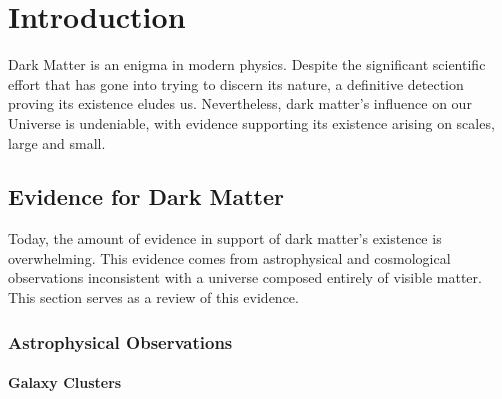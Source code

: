 \graphicspath{{img/chapter_1/}}


\chapter{Introduction}
\label{chapter:introduction}


Dark Matter is an enigma in modern physics. Despite the significant scientific
effort that has gone into trying to discern its nature, a definitive detection
proving its existence eludes us. Nevertheless, dark matter's influence 
on our Universe is undeniable, with evidence supporting its existence arising on  scales, large and small.


\section{Evidence for Dark Matter}

Today, the amount of evidence in support of dark matter's existence is overwhelming. This evidence comes from astrophysical and cosmological observations inconsistent with a universe composed entirely of visible matter. This section serves as a review of this evidence. 

\subsection{Astrophysical Observations}

\subsubsection*{Galaxy Clusters}

